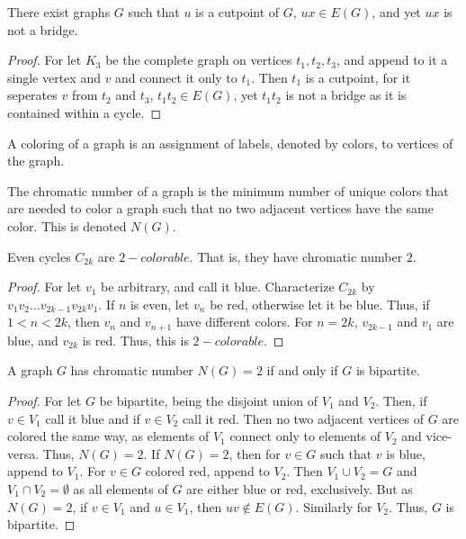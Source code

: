     \begin{theorem}
    There exist graphs $G$ such that $u$ is a cutpoint of $G$, $ux \in E(G)$, and yet $ux$ is not a bridge.
    \end{theorem}
    \begin{proof}
    For let $K_3$ be the complete graph on vertices $t_1,t_2,t_3$, and append to it a single vertex and $v$ and connect it only to $t_1$. Then $t_1$ is a cutpoint, for it seperates $v$ from $t_2$ and $t_3$, $t_1t_2\in E(G)$, yet $t_1 t_2$ is not a bridge as it is contained within a cycle.
    \end{proof}
    \begin{definition}
    A coloring of a graph is an assignment of labels, denoted by colors, to vertices of the graph.
    \end{definition}
    \begin{definition}
    The chromatic number of a graph is the minimum number of unique colors that are needed to color a graph such that no two adjacent vertices have the same color. This is denoted $N(G)$.
    \end{definition}
    \begin{theorem}
    Even cycles $C_{2k}$ are $2-colorable$. That is, they have chromatic number $2$.
    \end{theorem}
    \begin{proof}
    For let $v_1$ be arbitrary, and call it blue. Characterize $C_{2k}$ by $v_1 v_2 \hdots v_{2k-1}v_{2k} v_1$. If $n$ is even, let $v_n$ be red, otherwise let it be blue. Thus, if $1<n<2k$, then $v_n$ and $v_{n+1}$ have different colors. For $n=2k$, $v_{2k-1}$ and $v_1$ are blue, and $v_{2k}$ is red. Thus, this is $2-colorable$.
    \end{proof}
    \begin{theorem}
    A graph $G$ has chromatic number $N(G)=2$ if and only if $G$ is bipartite.
    \end{theorem}
    \begin{proof}
    For let $G$ be bipartite, being the disjoint union of $V_1$ and $V_2$. Then, if $v\in V_1$ call it blue and if $v\in V_2$ call it red. Then no two adjacent vertices of $G$ are colored the same way, as elements of $V_1$ connect only to elements of $V_2$ and vice-versa. Thus, $N(G)=2$. If $N(G)=2$, then for $v\in G$ such that $v$ is blue, append to $V_1$. For $v\in G$ colored red, append to $V_2$. Then $V_1\cup V_2 = G$ and $V_1\cap V_2 = \emptyset$ as all elements of $G$ are either blue or red, exclusively. But as $N(G)=2$, if $v\in V_1$ and $u\in V_1$, then $uv\notin E(G)$. Similarly for $V_2$. Thus, $G$ is bipartite.
    \end{proof}
